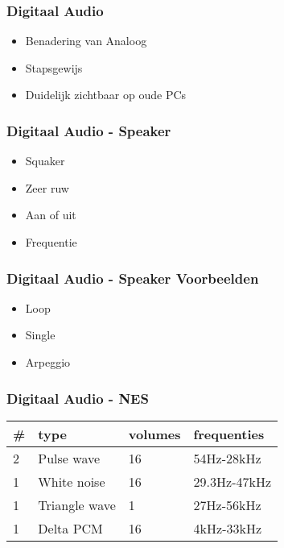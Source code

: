 \documentclass[aspectratio=43]{uva-inf-presentation}
\begin{document}

\begin{frame}
\frametitle{Digitaal Audio}

\begin{itemize}
\item Benadering van Analoog
\item Stapsgewijs
\item Duidelijk zichtbaar op oude PCs
\end{itemize}

\end{frame}


\begin{frame}
\frametitle{Digitaal Audio - Speaker}

\begin{itemize}
\item Squaker
\item Zeer ruw
\item Aan of uit
\item Frequentie
\end{itemize}

\end{frame}


\begin{frame}
\frametitle{Digitaal Audio - Speaker Voorbeelden}

\begin{itemize}
\item Loop
\item Single
\item Arpeggio
\end{itemize}

\end{frame}


\begin{frame}
\frametitle{Digitaal Audio - NES}

\begin{tabular}{|l|l|l|l|}
\hline \# & type & volumes & frequenties \\ \hline
2 & Pulse wave & 16 & 54Hz-28kHz \\
1 & White noise & 16 & 29.3Hz-47kHz \\
1 & Triangle wave & 1 & 27Hz-56kHz \\
1 & Delta PCM & 16 & 4kHz-33kHz \\ \hline
\end{tabular}

\end{frame}
\end{document}
